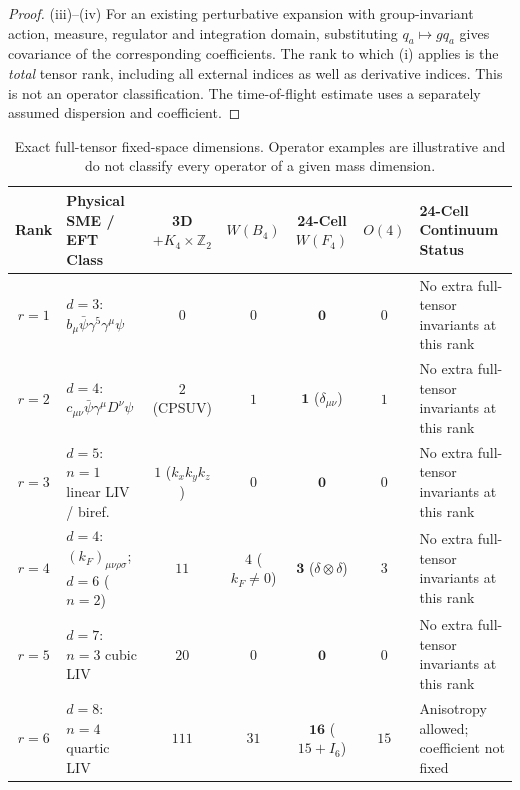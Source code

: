 \documentclass[11pt,a4paper]{article}
\begin{document}
\begin{proof}
(iii)--(iv) For an existing perturbative expansion with group-invariant action, measure, regulator and integration domain, substituting $q_a\mapsto gq_a$ gives covariance of the corresponding coefficients. The rank to which (i) applies is the \emph{total} tensor rank, including all external indices as well as derivative indices. This is not an operator classification. The time-of-flight estimate uses a separately assumed dispersion and coefficient.
\end{proof}

\begin{table}[!htbp]
\centering
\caption{Exact full-tensor fixed-space dimensions. Operator examples are illustrative and do not classify every operator of a given mass dimension.}
\label{tab:tensor-invariants}
\vspace{0.35em}
\footnotesize
\setlength{\tabcolsep}{4pt}
\renewcommand{\arraystretch}{1.18}
\begin{tabularx}{\textwidth}{c >{\raggedright\arraybackslash}X c c c c >{\raggedright\arraybackslash}X}
\toprule
\textbf{Rank} & \textbf{Physical SME / EFT Class} & \textbf{3D $+K_4\times\mathbb{Z}_2$} & \textbf{$W(B_4)$} & \textbf{24-Cell $W(F_4)$} & \textbf{$O(4)$} & \textbf{24-Cell Continuum Status} \\
\midrule
$r = 1$ & $d = 3$: $b_\mu\bar{\psi}\gamma^5\gamma^\mu\psi$ & $0$ & $0$ & $\mathbf{0}$ & $0$ & No extra full-tensor invariants at this rank \\
$r = 2$ & $d = 4$: $c_{\mu\nu}\bar{\psi}\gamma^\mu D^\nu\psi$ & $2$ (CPSUV) & $1$ & $\mathbf{1}$ ($\delta_{\mu\nu}$) & $1$ & No extra full-tensor invariants at this rank \\
$r = 3$ & $d = 5$: $n=1$ linear LIV / biref. & $1$ ($k_x k_y k_z$) & $0$ & $\mathbf{0}$ & $0$ & No extra full-tensor invariants at this rank \\
$r = 4$ & $d = 4$: $(k_F)_{\mu\nu\rho\sigma}$; $d=6$ ($n=2$) & $11$ & $4$ ($k_F \neq 0$) & $\mathbf{3}$ ($\delta\otimes\delta$) & $3$ & No extra full-tensor invariants at this rank \\
$r = 5$ & $d = 7$: $n=3$ cubic LIV & $20$ & $0$ & $\mathbf{0}$ & $0$ & No extra full-tensor invariants at this rank \\
$r = 6$ & $d = 8$: $n=4$ quartic LIV & $111$ & $31$ & $\mathbf{16}$ ($15 + I_6$) & $15$ & Anisotropy allowed; coefficient not fixed \\
\bottomrule
\end{tabularx}
\end{table}
\end{document}
